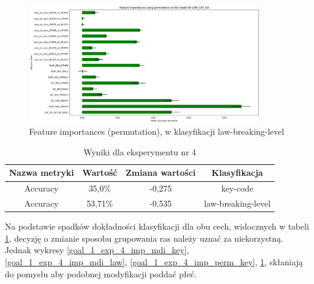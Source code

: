 \documentclass{classrep}
\begin{document}
{{{{                    \begin{figure}[!htbp]
                        \centering
                        \includegraphics[width=0.9\textwidth]{img/5.1.3/4/Feature importances using permutation on full model for LAW_CAT_CD.png}
                        \caption{Feature importances (permutation), w klasyfikacji law-breaking-level}
                        \label{goal_1_exp_4_imp_perm_law}
                    \end{figure}
                    
                    \begin{table}
                    \centering
                     \begin{tabular}{|c|c|c|c|}
                            \hline
                          Nazwa metryki & Wartość & Zmiana wartości & Klasyfikacja \\ \hline
                            Accuracy &  35,0\% & -0,275 & key-code\\ \hline
                            Accuracy &  53,71\% & -0,535 & law-breaking-level\\ \hline
                        \end{tabular}
                        \caption{Wyniki dla eksperymentu nr 4}
                        \label{goal_1_exp_4_results}
                     \end{table}
                     \FloatBarrier
                    Na podstawie spadków dokładności klasyfikacji dla obu cech,
                    widocznych w tabeli \ref{goal_1_exp_4_results}, decyzję o zmianie
                    sposobu grupowania ras należy uznać za niekorzystną. Jednak wykresy
                    \ref{goal_1_exp_4_imp_mdi_key}, \ref{goal_1_exp_4_imp_mdi_law},
                    \ref{goal_1_exp_4_imp_perm_key}, \ref{goal_1_exp_4_imp_perm_law},
                    skłaniają do pomysłu aby podobnej modyfikacji poddać płeć.
                }

}}}
\end{document}
